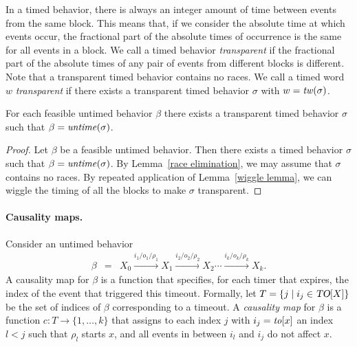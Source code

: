 
In a timed behavior, there is always an integer amount of time between events from the same block.
This means that, if we consider the absolute time at which events occur, the fractional part of the absolute times
of occurrence is the same for all events in a block.
We call a timed behavior \emph{transparent} if the fractional part of the absolute times of any pair of events from different blocks is different. Note that a transparent timed behavior contains no races.
\ifshort
We call a timed word $w$ \emph{transparent} if there exists a transparent timed behavior $\sigma$ with 
$w = \mathit{tw}(\sigma)$.
\fi

\begin{lemma}
\label{lemma: transparent timed behavior}
For each feasible untimed behavior $\beta$ there exists
a transparent timed behavior $\sigma$ such that $\beta = \mathit{untime}(\sigma)$.
\end{lemma}
\iflong
\begin{proof}
Let $\beta$ be a feasible untimed behavior.
Then there exists a timed behavior $\sigma$ such that $\beta = \mathit{untime}(\sigma)$.
By Lemma~\ref{race elimination}, we may assume that $\sigma$ contains no races.
By repeated application of Lemma~\ref{wiggle lemma}, we can wiggle the timing of all the blocks to make $\sigma$ transparent.
\end{proof}
\fi

\iflong
\paragraph{Causality maps.} 
Consider an untimed behavior
\begin{eqnarray*}
\beta & = & X_0 \xrightarrow{i_1/o_1/\rho_1} X_1  \xrightarrow{i_2/o_2/\rho_2} X_2 \cdots \xrightarrow{i_k/o_k/\rho_k} X_{k}.
\end{eqnarray*}
A causality map for $\beta$ is a function that specifies, for each timer that expires, the index of the event that
triggered this timeout.
Formally, let $T = \{ j \mid i_j \in \mbox{\sl TO}[X] \}$ be the set of indices of $\beta$ corresponding to a timeout.
A \emph{causality map} for $\beta$ is a function $c: T \rightarrow \{ 1 ,\ldots, k \}$ that assigns
to each index $j$ with $i_j = \mathit{to}[x]$ an index $l < j$ such that $\rho_l$ starts $x$, and all events in between $i_l$ and $i_j$
do not affect $x$.

